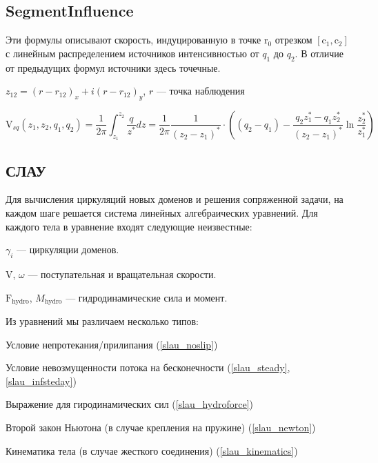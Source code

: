\documentclass[14pt]{extreport}
\newcommand{\br}[1]{\boldsymbol{\mathrm{#1}}}
\renewcommand{\vec}[1]{\br{#1}}
\newenvironment{packed_itemize}{
\begin{itemize}
  \setlength{\itemsep}{1pt}
  \setlength{\parskip}{0pt}
  \setlength{\parsep}{0pt}
}{\end{itemize}}
\begin{document}
\subsection{SegmentInfluence}
\label{SegmentInfluence}

Эти формулы описывают скорость, индуцированную в точке $\vec r_0$ отрезком $[\vec c_1, \vec c_2]$ с линейным распределением источников интенсивностью от $q_1$ до $q_2$. В отличие от предыдущих формул источники здесь точечные.

$z_{12} = (r - r_{12})_x + i (r-r_{12})_y$, $r$ --- точка наблюдения

\begin{equation}
\label{eq_SegmentInfluence_source}
\vec V_{sq} (z_1, z_2, q_1, q_2) = \dfrac{1}{2\pi}  \int_{z_1}^{z_2}\dfrac{q}{z^*} dz = \dfrac{1}{2\pi} \dfrac{1}{(z_2-z_1)^*} \cdot \left(  (q_2-q_1) - \dfrac{q_2 z_1^* - q_1 z_2^*}{(z_2-z_1)^*}\ln \dfrac{z_2^*}{z_1^*} \right)
\end{equation}

\subsection{СЛАУ}

Для вычисления циркуляций новых доменов и решения сопряженной задачи, на каждом шаге решается система линейных алгебраических уравнений. Для каждого тела в уравнение входят следующие неизвестные:
\begin{packed_itemize}
\item $\gamma_{i}$ --- циркуляции доменов.
\item $\vec V$, $\omega$ --- поступательная и вращательная скорости.
\item $\vec F_\text{hydro}$, $M_\text{hydro}$ --- гидродинамические сила и момент.
\end{packed_itemize}

Из уравнений мы различаем несколько типов:
\begin{packed_itemize}
\item Условие непротекания/прилипания (\ref{slau_noslip})
\item Условие невозмущенности потока на бесконечности (\ref{slau_steady}, \ref{slau_infsteday})
\item Выражение для гиродинамических сил (\ref{slau_hydroforce})
\item Второй закон Ньютона (в случае крепления на пружине) (\ref{slau_newton})
\item Кинематика тела (в случае жесткого соединения) (\ref{slau_kinematics})
\end{packed_itemize}
\end{document}
